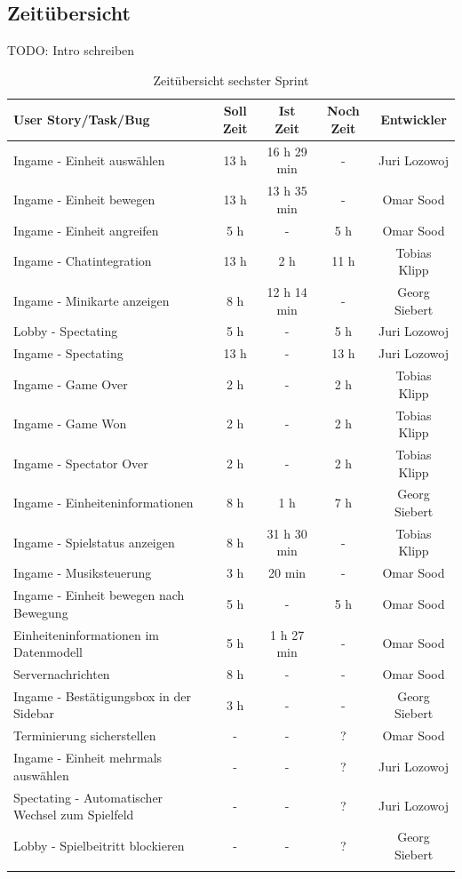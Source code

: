 \documentclass[12pt, titlepage]{scrartcl}
\begin{document}
    	\subsection{Zeit\"ubersicht}
    		TODO: Intro schreiben
    		\begin{longtable}[H]{p{6cm} c c c c }
    			\label{Time_2}
    			\textbf{User Story/Task/Bug} & \textbf{Soll Zeit} & \textbf{Ist Zeit} & \textbf{Noch Zeit} & \textbf{Entwickler} \\
    			\toprule
    			\endhead
    			Ingame - Einheit ausw\"ahlen & 13 h & 16 h 29 min & - & Juri Lozowoj \\
    			Ingame - Einheit bewegen & 13 h & 13 h 35 min & - & Omar Sood \\
    			Ingame - Einheit angreifen & 5 h & - & 5 h & Omar Sood \\
    			Ingame - Chatintegration & 13 h & 2 h & 11 h & Tobias Klipp \\
    			Ingame - Minikarte anzeigen & 8 h & 12 h 14 min & - & Georg Siebert \\
    			Lobby - Spectating & 5 h & - & 5 h & Juri Lozowoj \\
    			Ingame - Spectating & 13 h & - & 13 h & Juri Lozowoj \\
    			Ingame - Game Over & 2 h & - & 2 h & Tobias Klipp \\
    			Ingame - Game Won & 2 h & - & 2 h & Tobias Klipp \\
    			Ingame - Spectator Over & 2 h & - & 2 h & Tobias Klipp \\
    			Ingame - Einheiteninformationen & 8 h & 1 h & 7 h & Georg Siebert \\
    			Ingame - Spielstatus anzeigen & 8 h & 31 h 30 min & - & Tobias Klipp \\
    			Ingame - Musiksteuerung & 3 h & 20 min & - & Omar Sood \\
    			Ingame - Einheit bewegen nach Bewegung & 5 h & - & 5 h & Omar Sood \\
    			\midrule
    			Einheiteninformationen im Datenmodell & 5 h & 1 h 27 min & - & Omar Sood \\
    			Servernachrichten & 8 h & - & - & Omar Sood \\
    			Ingame - Best\"atigungsbox in der Sidebar & 3 h & - & - & Georg Siebert \\
    			\midrule
    			Terminierung sicherstellen & - & - & ? & Omar Sood \\
    			Ingame - Einheit mehrmals ausw\"ahlen & - & - & ? & Juri Lozowoj \\
    			Spectating - Automatischer Wechsel zum Spielfeld & - & - & ? & Juri Lozowoj \\
    			Lobby - Spielbeitritt blockieren & - & - & ? & Georg Siebert \\
    			\caption{Zeit\"ubersicht sechster Sprint}
    		\end{longtable}
\end{document}
